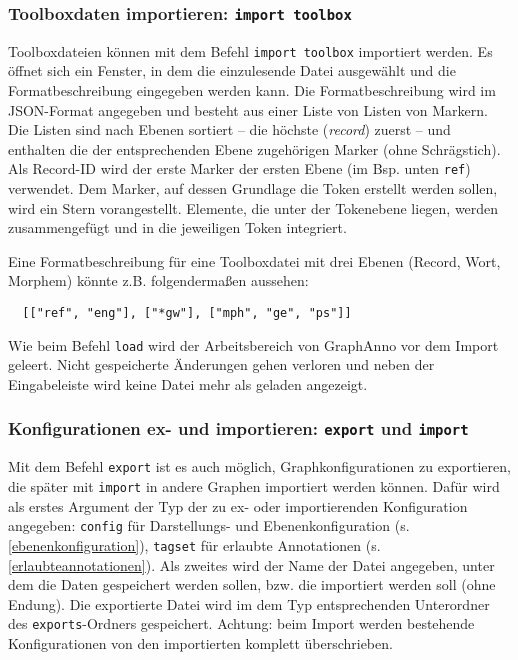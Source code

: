 \documentclass[12pt]{scrartcl}
\begin{document}
\subsubsection{Toolboxdaten importieren: \texttt{import toolbox}}

Toolboxdateien können mit dem Befehl \texttt{import toolbox} importiert werden. Es öffnet sich ein Fenster, in dem die einzulesende Datei ausgewählt und die Formatbeschreibung eingegeben werden kann. Die Formatbeschreibung wird im JSON-Format angegeben und besteht aus einer Liste von Listen von Markern. Die Listen sind nach Ebenen sortiert – die höchste (\textit{record}) zuerst – und enthalten die der entsprechenden Ebene zugehörigen Marker (ohne Schrägstich). Als Record-ID wird der erste Marker der ersten Ebene (im Bsp. unten \texttt{ref}) verwendet. Dem Marker, auf dessen Grundlage die Token erstellt werden sollen, wird ein Stern vorangestellt. Elemente, die unter der Tokenebene liegen, werden zusammengefügt und in die jeweiligen Token integriert.

Eine Formatbeschreibung für eine Toolboxdatei mit drei Ebenen (Record, Wort, Morphem) könnte z.B. folgendermaßen aussehen:
\begin{verbatim}
  [["ref", "eng"], ["*gw"], ["mph", "ge", "ps"]]
\end{verbatim}

Wie beim Befehl \texttt{load} wird der Arbeitsbereich von GraphAnno vor dem Import geleert. Nicht gespeicherte Änderungen gehen verloren und neben der Eingabeleiste wird keine Datei mehr als geladen angezeigt.


\subsubsection{Konfigurationen ex- und importieren: \texttt{export} und \texttt{import}}

Mit dem Befehl \texttt{export} ist es auch möglich, Graphkonfigurationen zu exportieren, die später mit \texttt{import} in andere Graphen importiert werden können. Dafür wird als erstes Argument der Typ der zu ex- oder importierenden Konfiguration angegeben: \texttt{config} für Darstellungs- und Ebenenkonfiguration (s. \ref{ebenenkonfiguration}), \texttt{tagset} für erlaubte Annotationen (s. \ref{erlaubteannotationen}). Als zweites wird der Name der Datei angegeben, unter dem die Daten gespeichert werden sollen, bzw. die importiert werden soll (ohne Endung). Die exportierte Datei wird im dem Typ entsprechenden Unterordner des \texttt{exports}-Ordners gespeichert. Achtung: beim Import werden bestehende Konfigurationen von den importierten komplett überschrieben.
\end{document}
